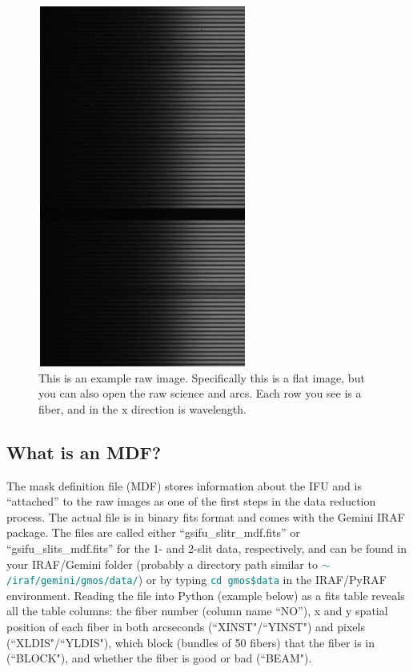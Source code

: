 \documentclass[12pt]{report}
\newcommand{\ty}[1]{\textcolor{teal}{\texttt{#1}}}
\begin{document}
\begin{figure}[h]
\centering
\includegraphics{raw_flat.jpeg}
\caption[Example of DS9 cube diaglog box]{This is an example raw image. Specifically this is a flat image, but you can also open the raw science and arcs. Each row you see is a fiber, and in the x direction is wavelength.}
\label{fig:rawflat}
\end{figure}

\subsection{What is an MDF?}
The mask definition file (MDF) stores information about the IFU and is ``attached'' to the raw images as one of the first steps in the data reduction process. The actual file is in binary fits format and comes with the Gemini IRAF package. The files are called either ``gsifu\_slitr\_mdf.fits'' or ``gsifu\_slits\_mdf.fits'' for the 1- and 2-slit data, respectively, and can be found in your IRAF/Gemini folder (probably a directory path similar to \ty{$\sim$/iraf/gemini/gmos/data/}) or by typing \ty{cd gmos\$data} in the IRAF/PyRAF environment. Reading the file into Python (example below) as a fits table reveals all the table columns: the fiber number (column name ``NO''), x and y spatial position of each fiber in both arcseconds (``XINST"/``YINST") and pixels (``XLDIS"/``YLDIS"), which block (bundles of 50 fibers) that the fiber is in (``BLOCK"), and whether the fiber is good or bad (``BEAM"). 
\end{document}
